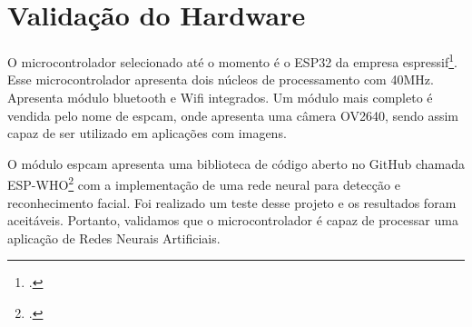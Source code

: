 \section{Validação do Hardware}

O microcontrolador selecionado até o momento é o ESP32 da empresa espressif\footcite{espressif.com}. Esse microcontrolador
apresenta dois núcleos de processamento com 40MHz. Apresenta módulo bluetooth e Wifi integrados.
Um módulo mais completo é vendida pelo nome de espcam, onde apresenta uma câmera OV2640,
sendo assim capaz de ser utilizado em aplicações com imagens. 

O módulo espcam apresenta uma biblioteca de código aberto no GitHub chamada ESP-WHO\footcite{ESP-WHO: https://github.com/espressif/esp-who}
com a implementação de uma rede neural para detecção e reconhecimento facial. Foi realizado um teste desse projeto
e os resultados foram aceitáveis. Portanto, validamos que o microcontrolador é capaz de processar uma aplicação de Redes Neurais Artificiais.

